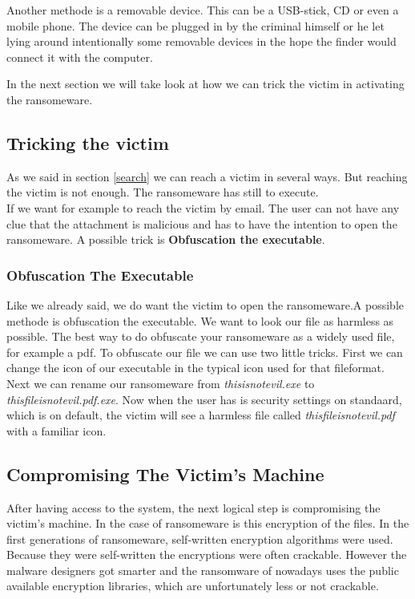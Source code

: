 Another methode is a removable device. This can be a USB-stick, CD or even a mobile phone. The device can be plugged in by the criminal himself or he let lying around intentionally some removable devices in the hope the finder would connect it with the computer.

In the next section we will take look at how we can trick the victim in activating the ransomeware.

\subsection{Tricking the victim}\label{theorie_trick}

As we said in section \ref{search} we can reach a victim in several ways. But reaching the victim is not enough. The ransomeware has still to execute.\\

If we want for example to reach the victim by email. The user can not have any clue that the attachment is malicious and has to have the intention to open the ransomeware. A possible trick is \textbf{Obfuscation the executable}.

\subsubsection{Obfuscation The Executable}

Like we already said, we do want the victim to open the ransomeware.A possible methode is obfuscation the executable. We want to look our file as harmless as possible. The best way to do obfuscate your ransomeware as a widely used file, for example a pdf.
To obfuscate our file we can use two little tricks. First we can change the icon of our executable in the typical icon used for that fileformat. Next we can rename our ransomeware from \textit{thisisnotevil.exe} to \textit{thisfileisnotevil.pdf.exe}. 
Now when the user has is security settings on standaard, which is on default, the victim will see a harmless file called \textit{thisfileisnotevil.pdf} with a familiar icon.


\subsection{Compromising The Victim's Machine}\label{Compromising}

After having access to the system, the next logical step is compromising the victim's machine. In the case of ransomeware is this encryption of the files. In the first generations of ransomeware, self-written encryption algorithms were used. Because they were self-written the encryptions were often crackable. However the malware designers got smarter and the ransomware of nowadays uses the public available encryption libraries, which are unfortunately less or not crackable.

